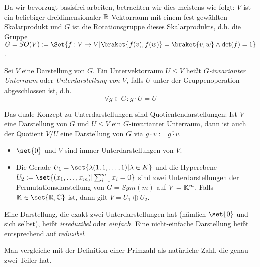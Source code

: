 \begin{remark}
Da wir bevorzugt basisfrei arbeiten, betrachten wir dies meistens wie folgt: $V$ ist ein beliebiger dreidimensionaler $\mathbb{R}$-Vektorraum mit einem fest gewählten Skalarprodukt und $G$ ist die Rotationsgruppe dieses Skalarprodukts, d.h. die Gruppe $G=SO(V) := \Set{f: V\to V | \braket{f(v),f(w)} = \braket{v,w} \wedge \det(f)=1}$.
\end{remark}

\begin{definition}[Unterdarstellungen]
Sei $V$ eine Darstellung von $G$. Ein Untervektorraum $U\leq V$ heißt \emph{$G$-invarianter Unterraum} oder \emph{Unterdarstellung von $V$}, falls $U$ unter der Gruppenoperation abgeschlossen ist, d.h.
\[\forall g\in G: g\cdot U = U\]
\end{definition}

\begin{lemma}[Quotienten]
Das duale Konzept zu Unterdarstellungen sind Quotientendarstellungen: Ist $V$ eine Darstellung von $G$ und $U\leq V$ ein $G$-invarianter Unterraum, dann ist auch der Quotient $V/U$ eine Darstellung von $G$ via $g\cdot\overline{v} := \overline{g\cdot v}$.
\end{lemma}

\begin{example}
\begin{itemize}
\item $\set{0}$ und $V$ sind immer Unterdarstellungen von $V$.
\item Die Gerade $U_1=\set{\lambda(1,1,\ldots,1) | \lambda\in K}$ und die Hyperebene $U_2 := \set{(x_1,\ldots,x_m) | \sum_{i=1}^m x_i = 0}$ sind zwei Unterdarstellungen der Permutationsdarstellung von $G=Sym(m)$ auf $V=\mathbb{K}^m$. Falls $\IK\in\set{\IR,\IC}$ ist, dann gilt $V=U_1\oplus U_2$.
\end{itemize}
\end{example}

\begin{definition}
Eine Darstellung, die exakt zwei Unterdarstellungen hat (nämlich $\set{0}$ und sich selbst), heißt \emph{irreduzibel} oder \emph{einfach}. Eine nicht-einfache Darstellung heißt entsprechend auf \emph{reduzibel}.
\end{definition}

\begin{remark}
Man vergleiche mit der Definition einer Primzahl als natürliche Zahl, die genau zwei Teiler hat.
\end{remark}

